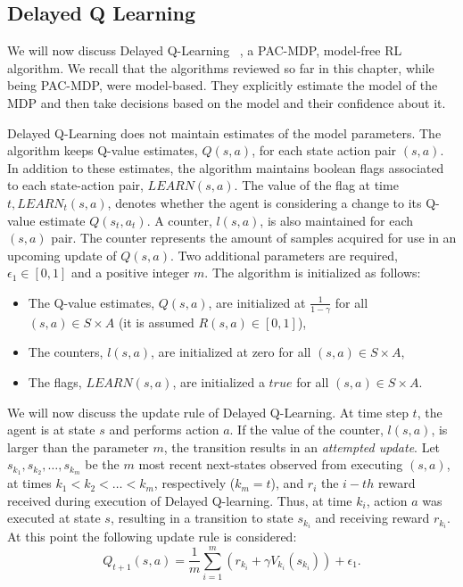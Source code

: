 \subsection{Delayed Q Learning}
We will now discuss Delayed Q-Learning ~\cite{Strehl:2006:PMR:1143844.1143955}, a PAC-MDP, model-free RL algorithm. We recall that the algorithms reviewed so far in this chapter, while being PAC-MDP, were model-based. They explicitly estimate the model of the MDP and then take decisions based on the model and their confidence about it.\par Delayed Q-Learning does not maintain estimates of the model parameters. The algorithm keeps Q-value estimates, $Q(s,a)$, for each state action pair $(s,a)$. In addition to these estimates, the algorithm maintains boolean flags associated to each state-action pair, $LEARN(s,a)$. The value of the flag at time $t, LEARN_t(s,a)$, denotes whether the agent is considering a change to its Q-value estimate $Q(s_t,a_t)$. A counter, $l(s,a)$, is also maintained for each $(s,a)$ pair. The counter represents the amount of samples acquired for use in an upcoming update of $Q(s,a)$. Two additional parameters are required, $\epsilon_1 \in [0,1]$ and a positive integer $m$. The algorithm is initialized as follows:
\begin{itemize}
	\item The Q-value estimates, $Q(s,a)$, are initialized at $\frac{1}{1-\gamma}$ for all $(s,a) \in S \times A$ (it is assumed $R(s,a) \in [0,1]$),
	\item The counters, $l(s,a)$, are initialized at zero for all $(s,a) \in S \times A$,
	\item The flags, $LEARN(s,a)$, are initialized a $true$ for all $(s,a) \in S \times A$.
\end{itemize}\par
We will now discuss the update rule of Delayed Q-Learning. At time step $t$, the agent is at state $s$ and performs action $a$. If the value of the counter, $l(s,a)$, is larger than the parameter $m$, the transition results in an \emph{attempted update}. Let $s_{k_1}, s_{k_2}, \ldots, s_{k_m}$ be the $m$ most recent next-states observed from executing $(s, a)$, at times $k_1< k_2 < \ldots < k_m$, respectively ($k_m=t$), and $r_i$ the $i-th$ reward received during execution of Delayed Q-learning. Thus, at time $k_i$, action $a$ was executed at state $s$, resulting in a transition to state $s_{k_i}$ and receiving reward $r_{k_i}$. At this point the following update rule is considered:
\begin{equation}
	Q_{t+1}(s,a)=\frac{1}{m}\sum_{i=1}^{m}(r_{k_i}+ \gamma V_{k_i}(s_{k_i})) +\epsilon_1.
\end{equation}
